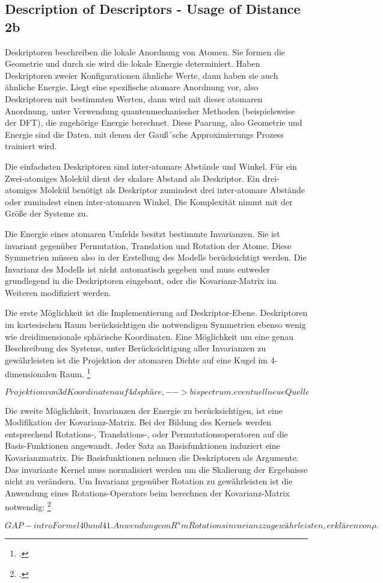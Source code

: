 \subsection{Description of Descriptors - Usage of Distance 2b}
Deskriptoren beschreiben die lokale Anordnung von Atomen. Sie formen die Geometrie und durch sie wird die lokale Energie determiniert. Haben Deskriptoren zweier Konfigurationen ähnliche Werte, dann haben sie auch ähnliche Energie. Liegt eine spezifische atomare Anordnung vor, also Deskriptoren mit bestimmten Werten, dann wird mit dieser atomaren Anordnung, unter Verwendung quantenmechanischer Methoden (beispielsweise der DFT), die zugehörige Energie berechnet. Diese Paarung, also Geometrie und Energie sind die Daten, mit denen der Gauß´sche Approximierungs Prozess trainiert wird. 

Die einfachsten Deskriptoren sind inter-atomare Abstände und Winkel. Für ein Zwei-atomiges Molekül dient der skalare Abstand als Deskriptor. Ein drei-atomiges Molekül benötigt als Deskriptor zumindest drei inter-atomare Abstände oder zumindest einen inter-atomaren Winkel. Die Komplexität nimmt mit der Größe der Systeme zu. 

Die Energie eines atomaren Umfelds besitzt bestimmte Invarianzen. Sie ist invariant gegenüber Permutation, Translation und Rotation der Atome. Diese Symmetrien müssen also in der Erstellung des Modells berücksichtigt werden. Die Invarianz des Modells ist nicht automatisch gegeben und muss entweder grundlegend in die Deskriptoren eingebaut, oder die Kovarianz-Matrix im Weiteren modifiziert werden. 



Die erste Möglichkeit ist die Implementierung auf Deskriptor-Ebene. Deskriptoren im kartesischen Raum berücksichtigen die notwendigen Symmetrien ebenso wenig wie dreidimensionale sphärische Koordinaten. Eine Möglichkeit um eine genau Beschreibung des Systems, unter Berücksichtigung aller Invarianzen zu gewährleisten ist die Projektion der atomaren Dichte auf eine Kugel im 4-dimensionalen Raum. \footcite[3]{GAP-2009}

$$ Projektion von 3d Koordinaten auf 4d sphäre, --> bispectrum. eventuell neue Quelle$$

Die zweite Möglichkeit, Invarianzen der Energie zu berücksichtigen, ist eine Modifikation der Kovarianz-Matrix. Bei der Bildung des Kernels werden entsprechend Rotations-, Translations-, oder Permutationsoperatoren auf die Basis-Funktionen angewandt. Jeder Satz an Basisfunktionen induziert eine Kovarianzmatrix. Die Basisfunktionen nehmen die Deskriptoren als Argumente. Das invariante Kernel muss normalisiert werden um die Skalierung der Ergebnisse nicht zu verändern. Um Invarianz gegenüber Rotation zu gewährleisten ist die Anwendung eines Rotations-Operators beim berechnen der Kovarianz-Matrix notwendig: \footcite[1055]{GAP-intro}


$$ GAP-intro Formel 40 und 41. Anwendung von R^ um Rotationsinvarianz zu gewährleisten, erklären von \rho. $$






